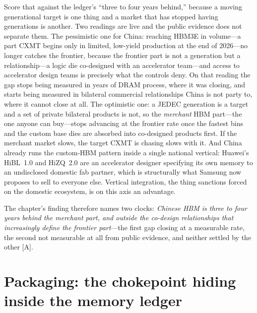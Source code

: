 Score that against the ledger's ``three to four years behind,'' because a moving generational target is one thing and a market that has stopped having generations is another. Two readings are live and the public evidence does not separate them. The pessimistic one for China: reaching HBM3E in volume---a part CXMT begins only in limited, low-yield production at the end of 2026---no longer catches the frontier, because the frontier part is not a generation but a relationship---a logic die co-designed with an accelerator team---and access to accelerator design teams is precisely what the controls deny. On that reading the gap stops being measured in years of DRAM process, where it was closing, and starts being measured in bilateral commercial relationships China is not party to, where it cannot close at all. The optimistic one: a JEDEC generation is a target and a set of private bilateral products is not, so the \emph{merchant} HBM part---the one anyone can buy---stops advancing at the frontier rate once the fastest bins and the custom base dies are absorbed into co-designed products first. If the merchant market slows, the target CXMT is chasing slows with it. And China already runs the custom-HBM pattern inside a single national vertical: Huawei's HiBL~1.0 and HiZQ~2.0 are an accelerator designer specifying its own memory to an undisclosed domestic fab partner, which is structurally what Samsung now proposes to sell to everyone else. Vertical integration, the thing sanctions forced on the domestic ecosystem, is on this axis an advantage.

The chapter's finding therefore names two clocks: \emph{Chinese HBM is three to four years behind the merchant part, and outside the co-design relationships that increasingly define the frontier part}---the first gap closing at a measurable rate, the second not measurable at all from public evidence, and neither settled by the other [A].

\section{Packaging: the chokepoint hiding inside the memory ledger}
\label{sec:packaging}

